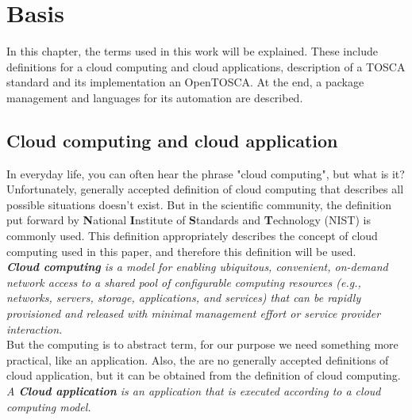 
\chapter{Basis}
\label{chap:basis}
In this chapter, the terms used in this work will be explained.
These include definitions for a cloud computing and cloud applications, description of a TOSCA standard and its implementation an OpenTOSCA.
At the end, a package management and languages for its automation are described.
\section{Cloud computing and cloud application} \label{sec:cloud}
In everyday life, you can often hear the phrase "cloud computing", but what is it?\\
Unfortunately, generally accepted definition of cloud computing that describes all possible situations doesn't exist. 
But in the scientific community, the definition put forward by \textbf{N}ational \textbf{I}nstitute of \textbf{S}tandards and \textbf{T}echnology (NIST) is commonly used. 
This definition appropriately describes the concept of cloud computing used in this paper, and therefore this definition will be used.\\
\emph{\textbf{Cloud computing}\label{def:nist} is a model for enabling ubiquitous, convenient, on-demand network access to a shared pool of configurable computing resources (e.g., networks, servers, storage, applications, and services) that can be rapidly provisioned and released with minimal management effort or service provider interaction.}~\cite*{nist}\\
But the computing is to abstract term, for our purpose we need something more practical, like an application.
Also, the are no generally accepted definitions of cloud application, but it can be obtained from the definition of cloud computing.\\
\emph{A \textbf{Cloud application}\label{def:capp} is an application that is executed according to a cloud computing model.}~\cite*{cloudapp}\\
